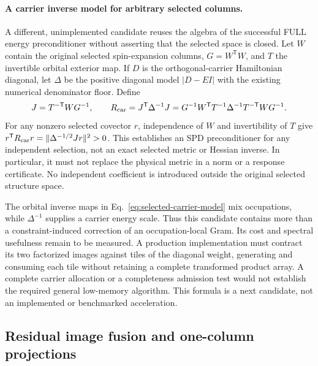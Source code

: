 \documentclass[11pt,a4paper]{article}
\newcommand{\Tr}{^{\mathsf T}}
\begin{document}
\paragraph{A carrier inverse model for arbitrary selected columns.}
A different, unimplemented candidate reuses the algebra of the successful
FULL energy preconditioner without asserting that the selected space is
closed. Let $W$ contain the original selected spin-expansion columns,
$G=W\Tr W$, and $T$ the invertible orbital exterior map. If $D$ is the
orthogonal-carrier Hamiltonian diagonal, let $\Delta$ be the positive
diagonal model $|D-EI|$ with the existing numerical denominator floor.
Define
\begin{equation}
 J=T^{-\mathsf T}WG^{-1},\qquad
 R_{\rm car}=J\Tr\Delta^{-1}J
 =G^{-1}W\Tr T^{-1}\Delta^{-1}T^{-\mathsf T}WG^{-1}.
 \label{eq:selected-carrier-model}
\end{equation}
For any nonzero selected covector $r$, independence of $W$ and
invertibility of $T$ give
$r\Tr R_{\rm car}r=\|\Delta^{-1/2}Jr\|^2>0$.
This establishes an SPD preconditioner for any independent selection,
not an exact selected metric or Hessian inverse. In particular, it must
not replace the physical metric in a norm or a response certificate.
No independent coefficient is introduced outside the original selected
structure space.

The orbital inverse maps in Eq.~\eqref{eq:selected-carrier-model} mix
occupations, while $\Delta^{-1}$ supplies a carrier energy scale. Thus
this candidate contains more than a constraint-induced correction of
an occupation-local Gram. Its cost and spectral usefulness remain to
be measured. A production implementation must contract its two factorized
images against tiles of the diagonal weight, generating and consuming
each tile without retaining a complete transformed product array. A
complete carrier allocation or a completeness admission test would not
establish the required general low-memory algorithm. This formula is a
next candidate, not an implemented or benchmarked acceleration.

\subsection{Residual image fusion and one-column projections}
\label{sec:scalar-source}
\end{document}
